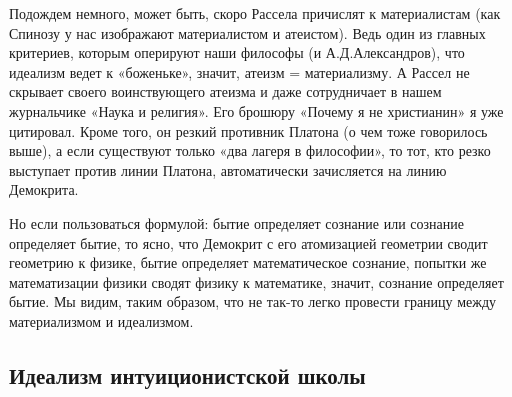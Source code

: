 Подождем немного, может быть,  скоро Рассела причислят к материалистам
(как  Спинозу  у  нас   изображают  материалистом  и  атеистом).  Ведь
один  из  главных  критериев,   которым  оперируют  наши  философы  (и
А.Д.Александров), что  идеализм ведет  к «боженьке», значит,  атеизм =
материализму. А Рассел не скрывает своего воинствующего атеизма и даже
сотрудничает  в  нашем  журнальчике  «Наука и  религия».  Его  брошюру
«Почему  я не  христианин»  я  уже цитировал.  Кроме  того, он  резкий
противник  Платона (о  чем тоже  говорилось выше),  а если  существуют
только «два  лагеря в философии»,  то тот, кто резко  выступает против
линии Платона, автоматически зачисляется на линию Демокрита.

Но если пользоваться формулой:  бытие определяет сознание или сознание
определяет бытие,  то ясно, что  Демокрит с его  атомизацией геометрии
сводит геометрию  к физике, бытие определяет  математическое сознание,
попытки же  математизации физики  сводят физику к  математике, значит,
сознание  определяет бытие.  Мы видим,  таким образом,  что не  так-то
легко провести границу между материализмом и идеализмом.

\subsection{Идеализм интуиционистской школы}

